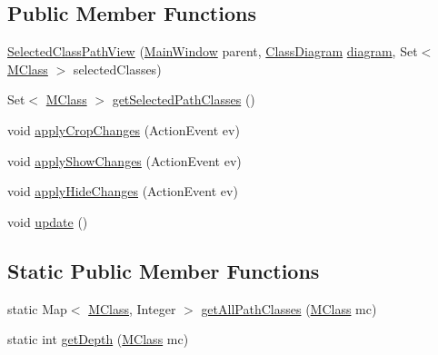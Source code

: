 \subsection*{Public Member Functions}
\begin{DoxyCompactItemize}
\item 
\hyperlink{classorg_1_1tzi_1_1use_1_1gui_1_1views_1_1selection_1_1classselection_1_1_selected_class_path_view_af6c324a46db510e21dced2366b86a4de}{Selected\-Class\-Path\-View} (\hyperlink{classorg_1_1tzi_1_1use_1_1gui_1_1main_1_1_main_window}{Main\-Window} parent, \hyperlink{classorg_1_1tzi_1_1use_1_1gui_1_1views_1_1diagrams_1_1classdiagram_1_1_class_diagram}{Class\-Diagram} \hyperlink{classorg_1_1tzi_1_1use_1_1gui_1_1views_1_1selection_1_1_class_selection_view_a8cc2a534904dde3a8f6bebf8c646934d}{diagram}, Set$<$ \hyperlink{interfaceorg_1_1tzi_1_1use_1_1uml_1_1mm_1_1_m_class}{M\-Class} $>$ selected\-Classes)
\item 
Set$<$ \hyperlink{interfaceorg_1_1tzi_1_1use_1_1uml_1_1mm_1_1_m_class}{M\-Class} $>$ \hyperlink{classorg_1_1tzi_1_1use_1_1gui_1_1views_1_1selection_1_1classselection_1_1_selected_class_path_view_a10309e37180f5aaad4271fc52cb300e9}{get\-Selected\-Path\-Classes} ()
\item 
void \hyperlink{classorg_1_1tzi_1_1use_1_1gui_1_1views_1_1selection_1_1classselection_1_1_selected_class_path_view_a97b27ff08e5c85c57c7ac4b2ced612f1}{apply\-Crop\-Changes} (Action\-Event ev)
\item 
void \hyperlink{classorg_1_1tzi_1_1use_1_1gui_1_1views_1_1selection_1_1classselection_1_1_selected_class_path_view_ae6783c730b0a9719def3df794e0c9f20}{apply\-Show\-Changes} (Action\-Event ev)
\item 
void \hyperlink{classorg_1_1tzi_1_1use_1_1gui_1_1views_1_1selection_1_1classselection_1_1_selected_class_path_view_a48f900e7d6769cd29fa44b1573067784}{apply\-Hide\-Changes} (Action\-Event ev)
\item 
void \hyperlink{classorg_1_1tzi_1_1use_1_1gui_1_1views_1_1selection_1_1classselection_1_1_selected_class_path_view_a66d4e2d0e76774c9696269b854332ed9}{update} ()
\end{DoxyCompactItemize}
\subsection*{Static Public Member Functions}
\begin{DoxyCompactItemize}
\item 
static Map$<$ \hyperlink{interfaceorg_1_1tzi_1_1use_1_1uml_1_1mm_1_1_m_class}{M\-Class}, Integer $>$ \hyperlink{classorg_1_1tzi_1_1use_1_1gui_1_1views_1_1selection_1_1classselection_1_1_selected_class_path_view_ab2578efb1f07dbce6af091b16a14d275}{get\-All\-Path\-Classes} (\hyperlink{interfaceorg_1_1tzi_1_1use_1_1uml_1_1mm_1_1_m_class}{M\-Class} mc)
\item 
static int \hyperlink{classorg_1_1tzi_1_1use_1_1gui_1_1views_1_1selection_1_1classselection_1_1_selected_class_path_view_ab0842b0897a691f723962bc4d34d733f}{get\-Depth} (\hyperlink{interfaceorg_1_1tzi_1_1use_1_1uml_1_1mm_1_1_m_class}{M\-Class} mc)
\end{DoxyCompactItemize}
